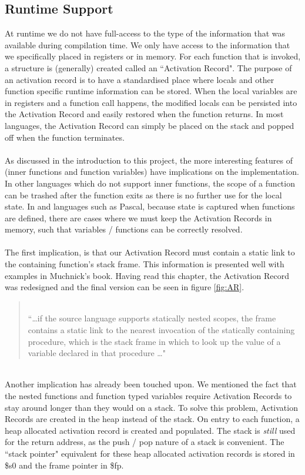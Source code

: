 \subsection{Runtime Support}
At runtime we do not have full-access to the type of the information that was available during compilation time. We only have access to the information that we specifically placed in registers or in memory. For each function that is invoked, a structure is (generally) created called an ``Activation Record". The purpose of an activation record is to have a standardised place where locals and other function specific runtime information can be stored. When the local variables are in registers and a function call happens, the modified locals can be persisted into the Activation Record and easily restored when the function returns. In most languages, the Activation Record can simply be placed on the stack and popped off when the function terminates.
\ \\ \ \\
As discussed in the introduction to this project, the more interesting features of \mmc (inner functions and function variables) have implications on the implementation. In other languages which do not support inner functions, the scope of a function can be trashed after the function exits as there is no further use for the local state. In \mmc and languages such as Pascal, because state is captured when functions are defined, there are cases where we must keep the Activation Records in memory, such that variables / functions can be correctly resolved.
\ \\ \ \\
The first implication, is that our Activation Record must contain a static link to the containing function's stack frame. This information is presented well with examples in Muchnick's book. Having read this chapter, the Activation Record was redesigned and the final version can be seen in figure \ref{fig:AR}.
\begin{quotation}
\ \\
``\ldots if the source language supports statically nested scopes, the frame contains a static link to the nearest invocation of the statically containing procedure, which is the stack frame in which to look up the value of a variable declared in that procedure \ldots"\cite{muchnick1997}
\end{quotation}
\ \\
Another implication has already been touched upon. We mentioned the fact that the nested functions and function typed variables require Activation Records to stay around longer than they would on a stack. To solve this problem, Activation Records are created in the heap instead of the stack. On entry to each function, a heap allocated activation record is created and populated. The stack is \emph{still} used for the return address, as the push / pop nature of a stack is convenient. The ``stack pointer" equivalent for these heap allocated activation records is stored in \$s0 and the frame pointer in \$fp.

